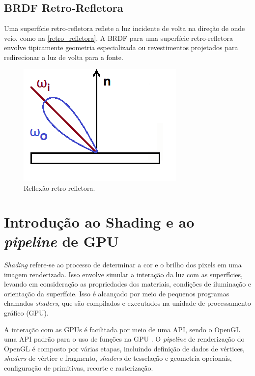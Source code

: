\documentclass[english, 
               brazil, 
               bsc] %
               {dcomp-abntex2}
\begin{document}
\subsection{BRDF Retro-Refletora}
Uma superfície retro-refletora reflete a luz incidente de volta na direção de onde veio, como na \autoref{retro_refletora}. A BRDF para uma superfície retro-refletora envolve tipicamente geometria especializada ou revestimentos projetados para redirecionar a luz de volta para a fonte.


\begin{figure}[H]
  \caption{\label{retro_refletora} \small Reflexão retro-refletora.}
        \begin{center}
            \includegraphics[scale=0.5]{./Imagens/retro-reflection-2d.png}
        \end{center}
\end{figure}




\section{Introdução ao Shading e ao \textit{pipeline} de GPU} \label{shading}


\textit{Shading} refere-se ao processo de determinar a cor e o brilho dos pixels em uma imagem renderizada. Isso envolve simular a interação da luz com as superfícies, levando em consideração as propriedades dos materiais, condições de iluminação e orientação da superfície. Isso é alcançado por meio de pequenos programas chamados \textit{shaders}, que são compilados e executados na unidade de processamento gráfico (GPU).




A interação com as GPUs é facilitada por meio de uma 
API, sendo o OpenGL uma API padrão para o uso de funções na GPU \cite{opengl_spec}. O \textit{pipeline} de renderização do OpenGL é composto por várias etapas, incluindo definição de dados de vértices, \textit{shaders} de vértice e fragmento, \textit{shaders} de tesselação e geometria opcionais, configuração de primitivas, recorte e rasterização.
\end{document}
